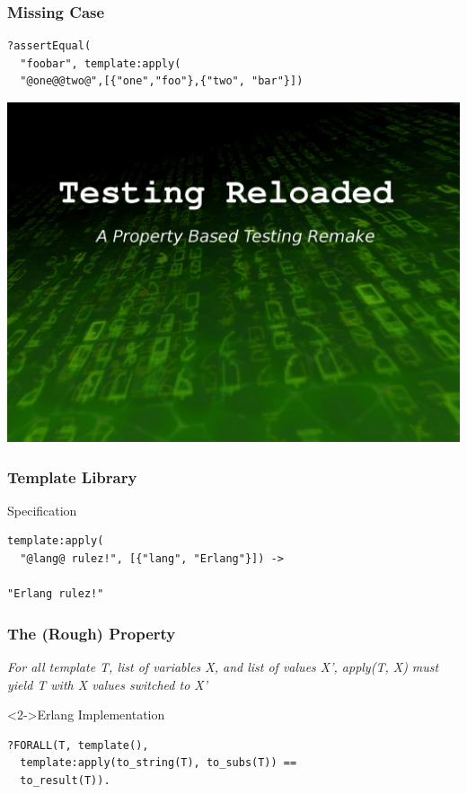 \documentclass[xcolor=dvipsnames]{beamer}
\begin{document}
\begin{frame}[fragile]
  \frametitle{Missing Case}
\begin{verbatim}
?assertEqual(
  "foobar", template:apply(
  "@one@@two@",[{"one","foo"},{"two", "bar"}])
\end{verbatim}
\end{frame}

\begin{frame}[plain]
  \includegraphics[width=\textwidth]{images/matrix}
\end{frame}

\begin{frame}[fragile]
  \frametitle{Template Library}

  \begin{block}{Specification}%
\begin{verbatim}
template:apply(
  "@lang@ rulez!", [{"lang", "Erlang"}]) ->

"Erlang rulez!"
\end{verbatim}
  \end{block}
\end{frame}

\begin{frame}[fragile]
  \frametitle{The (Rough) Property}

  \begin{center}
    \textit{ For all template T, list of variables X, and list of values X',
      apply(T, X) must yield T with X values switched to X'}
  \end{center}

  \begin{block}<2->{Erlang Implementation}
\begin{verbatim}
?FORALL(T, template(),
  template:apply(to_string(T), to_subs(T)) ==
  to_result(T)).
\end{verbatim}
  \end{block}
\end{frame}
\end{document}

